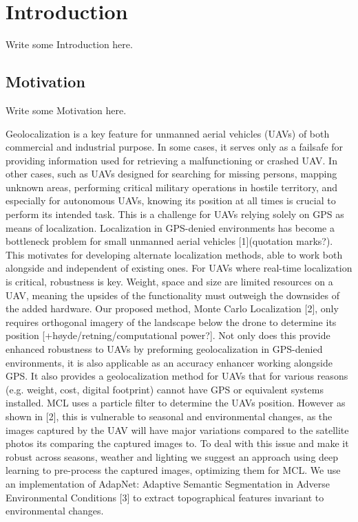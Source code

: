 \section{Introduction}     %
Write some Introduction here.
\subsection{Motivation}
Write some Motivation here.

\begin{introduction}
Geolocalization is a key feature for unmanned aerial vehicles (UAVs) of both commercial and industrial purpose. In some cases, it serves only as a failsafe for providing information used for retrieving a malfunctioning or crashed UAV. In other cases, such as UAVs designed for searching for missing persons, mapping unknown areas, performing critical military operations in hostile territory, and especially for autonomous UAVs, knowing its position at all times is crucial to perform its intended task. This is a challenge for UAVs relying solely on GPS as means of localization. Localization in GPS-denied environments has become a bottleneck problem for small unmanned aerial vehicles [1](quotation marks?). This motivates for developing alternate localization methods, able to work both alongside and independent of existing ones. For UAVs where real-time localization is critical, robustness is key. Weight, space and size are limited resources on a UAV, meaning the upsides of the functionality must outweigh the downsides of the added hardware. Our proposed method, Monte Carlo Localization [2], only requires orthogonal imagery of the landscape below the drone to determine its position [+høyde/retning/computational power?]. Not only does this provide enhanced robustness to UAVs by preforming geolocalization in GPS-denied environments, it is also applicable as an accuracy enhancer working alongside GPS. It also provides a geolocalization method for UAVs that for various reasons (e.g. weight, cost, digital footprint) cannot have GPS or equivalent systems installed. MCL uses a particle filter to determine the UAVs position. However as shown in [2], this is vulnerable to seasonal and environmental changes, as the images captured by the UAV will have major variations compared to the satellite photos its comparing the captured images to. To deal with this issue and make it robust across seasons, weather and lighting we suggest an approach using deep learning to pre-process the captured images, optimizing them for MCL. We use an implementation of AdapNet: Adaptive Semantic Segmentation in Adverse Environmental Conditions [3] to extract topographical features invariant to environmental changes.


\end{introduction}
